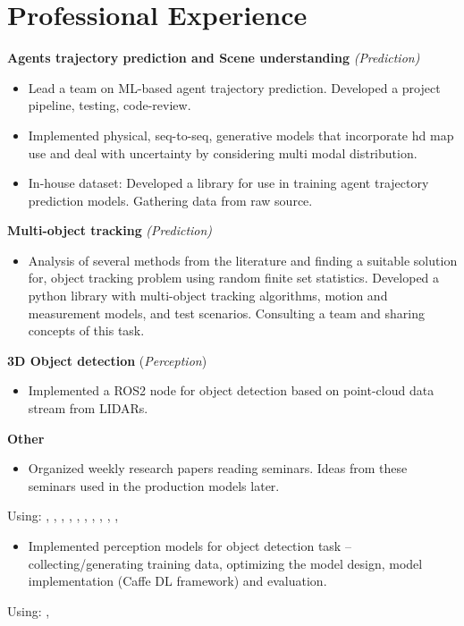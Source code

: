 \section*{\sectionformat Professional Experience}
% 

\textbf{Agents trajectory prediction and Scene understanding} \textit{(Prediction)}
\begin{itemize}
    \item Lead a team on ML-based agent trajectory prediction. Developed a project pipeline, testing, code-review.
    \item Implemented physical, seq-to-seq, generative models that incorporate hd map use and deal with uncertainty by considering multi modal distribution.
    \item In-house dataset: Developed a library for use in training agent trajectory prediction models. Gathering data from raw source.
\end{itemize}

\textbf{Multi-object tracking} \textit{(Prediction)}
\begin{itemize}
    \item Analysis of several methods from the literature and finding a suitable solution for, object tracking problem using random finite set statistics. Developed a python library with multi-object tracking algorithms, motion and measurement models, and test scenarios. Consulting a team and sharing concepts of this task.
\end{itemize}

\textbf{3D Object detection} (\textit{Perception})
\begin{itemize}
    \item Implemented a ROS2 node for object detection based on point-cloud data stream from LIDARs.
\end{itemize}

\textbf{Other}
\begin{itemize}
    \item Organized weekly research papers reading seminars. Ideas from these seminars used in the production models later.
\end{itemize}
Using: , , , , , , , , , , 
\horizontalline
% 
\begin{itemize}
    \item Implemented perception models for object detection task -- collecting/generating training data, optimizing the model design, model implementation (Caffe DL framework) and evaluation.
\end{itemize}
Using: , 

